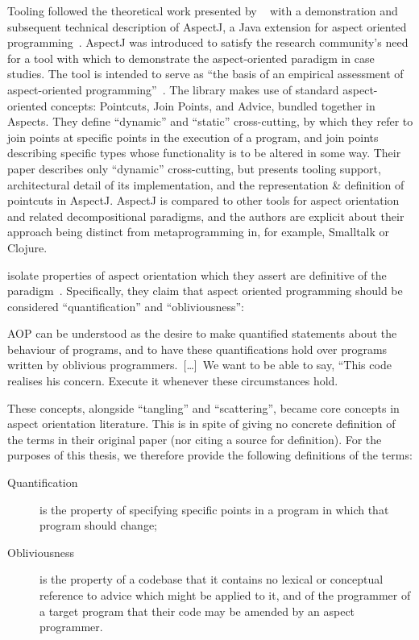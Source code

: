 Tooling followed the theoretical work presented by
\citeauthor{kiczales1997aspect}~\cite{kiczales1997aspect} with a demonstration
and subsequent technical description of AspectJ, a Java extension for aspect
oriented programming~\cite{AspectJLanguageAndTools,aspectj_intro}. AspectJ was
introduced to satisfy the research community's need for a tool with which to
demonstrate the aspect-oriented paradigm in case studies. The tool is intended
to serve as ``the basis of an empirical assessment of aspect-oriented
programming''~\cite{aspectj_intro}. The library makes use of standard
aspect-oriented concepts: Pointcuts, Join Points, and Advice, bundled together
in Aspects. They define ``dynamic'' and ``static'' cross-cutting, by which they
refer to join points at specific points in the execution of a program, and join
points describing specific types whose functionality is to be altered in some
way. Their paper describes only ``dynamic'' cross-cutting, but presents tooling
support, architectural detail of its implementation, and the representation \&
definition of pointcuts in AspectJ. AspectJ is compared to other tools for
aspect orientation and related decompositional paradigms, and the authors are
explicit about their approach being distinct from metaprogramming in, for
example, Smalltalk or Clojure.


\citeauthor{filman2000aspect} isolate properties of aspect orientation which
they assert are definitive of the paradigm~\cite{filman2000aspect}. Specifically, they claim that aspect
oriented programming should be considered ``quantification'' and
``obliviousness'':

\begin{blockquote}
AOP can be understood as the desire to make quantified statements about the
behaviour of programs, and to have these quantifications hold over programs
written by oblivious programmers.~[\ldots{}]~We want to be able to say, ``This
code realises his concern. Execute it whenever these circumstances hold.
\end{blockquote}

These concepts, alongside ``tangling'' and ``scattering'', became core
concepts in aspect orientation literature. This is in spite of
\citeauthor{filman2000aspect} giving no concrete definition of the terms in
their original paper (nor citing a source for definition). For the purposes of
this thesis, we therefore provide the following definitions of the terms:

\begin{description}
  \item[Quantification] is the property of specifying specific points in a
  program in which that program should change;
  \item[Obliviousness] is the property of a codebase that it contains no
  lexical or conceptual reference to advice which might be applied to it, and of
  the programmer of a target program that their code may be amended by an aspect programmer.
\end{description}

